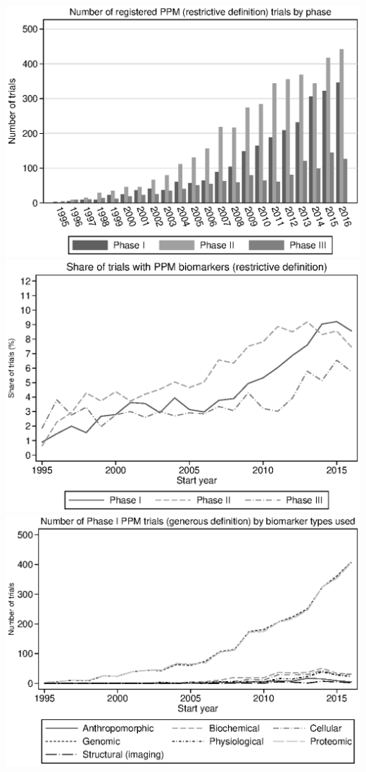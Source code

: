 \includegraphics{../figures/03c-r_ppm_count_by_phase.eps}
\includegraphics{../figures/03d-r_ppm_share_by_phase.eps}
\includegraphics{../figures/04a-trial_count_by_type_g_ppm_phase_1.eps}
